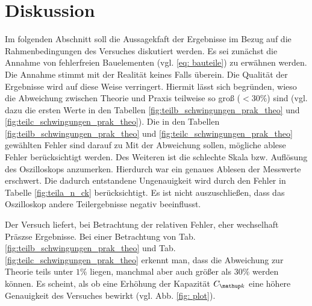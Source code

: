\section{Diskussion}
Im folgenden Abschnitt soll die Aussagekfaft der Ergebnisse im Bezug auf
die Rahmenbedingungen des Versuches diskutiert werden.
Es sei zunächst die Annahme von fehlerfreien Bauelementen (vgl. \eqref{eq: bauteile})
zu erwähnen werden. Die Annahme stimmt mit der Realität keines Falls überein. %
Die Qualität der Ergebnisse wird auf diese Weise verringert.
Hiermit lässt sich begründen, wieso die Abweichung zwischen Theorie und Praxis teilweise
so groß ($<30\%$) sind (vgl. dazu die ersten Werte in den Tabellen \ref{fig:teilb_schwingungen_prak_theo} und \ref{fig:teilc_schwingungen_prak_theo}).
Die in den Tabellen \ref{fig:teilb_schwingungen_prak_theo} und \ref{fig:teilc_schwingungen_prak_theo} gewählten Fehler sind darauf zu
Mit der Abweichung sollen, mögliche ablese Fehler berücksichtigt werden. %
Des Weiteren ist die schlechte Skala bzw. Auflösung des Oszilloskops anzumerken.
Hierdurch war ein genaues Ablesen der Messwerte erschwert.
Die dadurch entstandene Ungenauigkeit wird durch den Fehler in Tabelle \ref{fig:teila_n_ck} berücksichtigt.
Es ist nicht auszuschließen, dass das Oszilloskop andere Teilergebnisse negativ beeinflusst.

Der Versuch liefert, bei Betrachtung der relativen Fehler, eher wechselhaft Präszse Ergebnisse.
Bei einer Betrachtung von Tab. \ref{fig:teilb_schwingungen_prak_theo} und Tab. \ref{fig:teilc_schwingungen_prak_theo} erkennt man,  %
dass die Abweichung zur Theorie teils unter $1\%$ liegen, manchmal aber auch größer als $30\%$ werden können.
Es scheint, als ob eine Erhöhung der Kapazität $C\ua{k}$ eine höhere Genauigkeit des Versuches bewirkt (vgl. Abb. \ref{fig: plot}).
